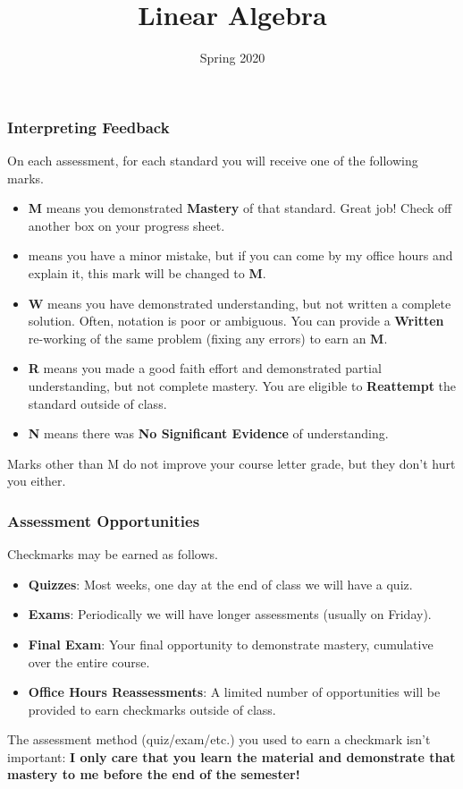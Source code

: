 \documentclass[aspectration=1610]{beamer}
\title{Linear Algebra}
\date{Spring 2020}
\begin{document}
\begin{frame}\frametitle{Interpreting Feedback}
On each assessment, for each standard you will receive one of the following marks.
\begin{itemize}
\item {\bf M} means you demonstrated \textbf{Mastery} of that standard.
      Great job!  Check off another box on your progress sheet.
\item {\bf *} means you have a minor mistake, but if you can come by my office hours and explain it,
      this mark will be changed to {\bf M}.
\item {\bf W} means you have demonstrated understanding, but not written a complete solution.  Often, notation is poor or ambiguous.  You can provide a {\bf Written} re-working of the same problem (fixing any errors) to earn an {\bf M}.
\item {\bf R} means you made a good faith effort and demonstrated
      partial understanding, but not complete mastery. You are eligible to
      \textbf{Reattempt} the standard outside of class.
\item {\bf N} means there was \textbf{No Significant Evidence} of understanding.
\end{itemize}

\vspace{0.2in}

Marks other than M do not improve your course letter grade, but
they don't hurt you either.
\end{frame}

\begin{frame}\frametitle{Assessment Opportunities}
Checkmarks may be earned as follows.
\begin{itemize}
\item {\bf Quizzes}: Most weeks, one day at the end of class we will have a quiz. 
\item {\bf Exams}: Periodically we will have longer assessments (usually on Friday).
\item {\bf Final Exam}: Your final opportunity to demonstrate mastery,
      cumulative over the entire course.
\item {\bf Office Hours Reassessments}: A limited number of opportunities
      will be provided to earn checkmarks outside of class.
\end{itemize}

\pause

\vspace{0.2in}

The assessment method (quiz/exam/etc.) you used to earn a checkmark
isn't important: \textbf{I only care that you
learn the material and demonstrate that mastery to me before the end of the
semester!}
\end{frame}
\end{document}
